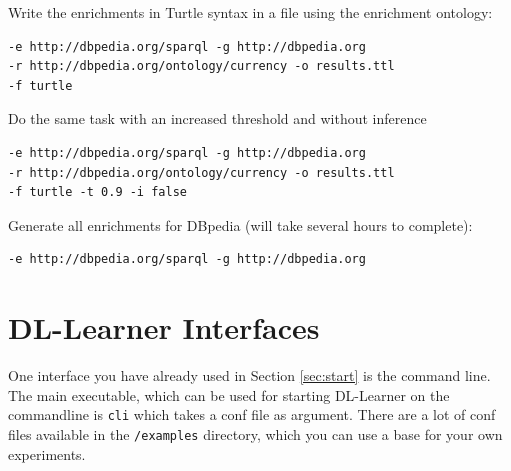 \documentclass[a4paper,12pt]{scrartcl}
\newcommand{\todo}[1]{\textbf{[ToDo: #1]}}
\begin{document}

Write the enrichments in Turtle syntax in a file using the enrichment ontology:
\begin{verbatim}
-e http://dbpedia.org/sparql -g http://dbpedia.org 
-r http://dbpedia.org/ontology/currency -o results.ttl
-f turtle
\end{verbatim}

Do the same task with an increased threshold and without inference

\begin{verbatim}
-e http://dbpedia.org/sparql -g http://dbpedia.org 
-r http://dbpedia.org/ontology/currency -o results.ttl
-f turtle -t 0.9 -i false
\end{verbatim}

Generate all enrichments for DBpedia (will take several hours to complete):
\begin{verbatim}
-e http://dbpedia.org/sparql -g http://dbpedia.org 
\end{verbatim}


\section{DL-Learner Interfaces}



One interface you have already used in Section \ref{sec:start} is the command line. The main executable, which can be used for starting DL-Learner on the commandline is \verb|cli| which takes a conf file as argument. There are a lot of conf files available in the \verb|/examples| directory, which you can use a base for your own experiments.

\end{document}
